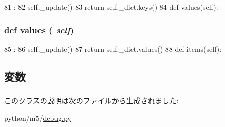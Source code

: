 \begin{DoxyCode}
81                   :
82         self._update()
83         return self._dict.keys()
84 
    def values(self):
\end{DoxyCode}
\hypertarget{classm5_1_1debug_1_1AllFlags_abb73a0060caeba53780d972f37623f1e}{
\subsubsection[{values}]{\setlength{\rightskip}{0pt plus 5cm}def values ( {\em self})}}
\label{classm5_1_1debug_1_1AllFlags_abb73a0060caeba53780d972f37623f1e}



\begin{DoxyCode}
85                     :
86         self._update()
87         return self._dict.values()
88 
    def items(self):
\end{DoxyCode}


\subsection{変数}
\hypertarget{classm5_1_1debug_1_1AllFlags_a4d2dd191e958f6b142f60e7f94ce0dd0}{
\subsubsection[{\_\-dict}]{}}
\label{classm5_1_1debug_1_1AllFlags_a4d2dd191e958f6b142f60e7f94ce0dd0}
\hypertarget{classm5_1_1debug_1_1AllFlags_aeeaa0c459069671087f2e77c5b65a76e}{
\subsubsection[{\_\-version}]{}}
\label{classm5_1_1debug_1_1AllFlags_aeeaa0c459069671087f2e77c5b65a76e}


このクラスの説明は次のファイルから生成されました:\begin{DoxyCompactItemize}
\item 
python/m5/\hyperlink{debug_8py}{debug.py}\end{DoxyCompactItemize}
